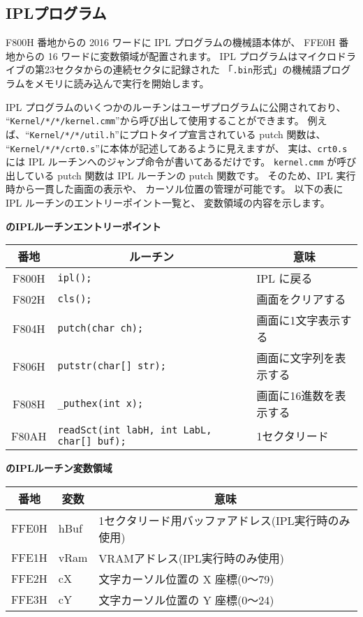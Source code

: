 \subsection{IPLプログラム}
\label{app:ipl}

F800H 番地からの 2016 ワードに IPL プログラムの機械語本体が、
FFE0H 番地からの 16 ワードに変数領域が配置されます。
IPL プログラムはマイクロドライブの第23セクタからの連続セクタに記録された
「\verb/.bin/形式」の機械語プログラムをメモリに読み込んで実行を開始します。

IPL プログラムのいくつかのルーチンはユーザプログラムに公開されており、
``{\tt Kernel/*/*/kernel.cmm}''から呼び出して使用することができます。
例えば、``{\tt Kernel/*/*/util.h}''にプロトタイプ宣言されている putch 関数は、
``{\tt Kernel/*/*/crt0.s}''に本体が記述してあるように見えますが、
実は、{\tt crt0.s }には IPL ルーチンへのジャンプ命令が書いてあるだけです。
{\tt kernel.cmm} が呼び出している putch 関数は IPL ルーチンの putch 関数です。
そのため、IPL 実行時から一貫した画面の表示や、
カーソル位置の管理が可能です。
以下の表に IPL ルーチンのエントリーポイント一覧と、
変数領域の内容を示します。

\begin{center}
{\bf \tac のIPLルーチンエントリーポイント} \\
\begin{tabular}{|c|l|l|}
\hline
番地  & \multicolumn{1}{|c|}{ルーチン} & \multicolumn{1}{|c|}{意味} \\
\hline
F800H & \verb/ipl();/                  & IPL に戻る                 \\
F802H & \verb/cls();/                  & 画面をクリアする           \\
F804H & \verb/putch(char ch);/         & 画面に1文字表示する        \\
F806H & \verb/putstr(char[] str);/     & 画面に文字列を表示する     \\
F808H & \verb/_puthex(int x);/         & 画面に16進数を表示する     \\
F80AH & \verb/readSct(int labH, int LabL, char[] buf);/ & 1セクタリード \\
\hline
\end{tabular}
\end{center}

\begin{center}
{\bf \tac のIPLルーチン変数領域} \\
\begin{tabular}{|c|l|l|}
\hline
番地  & \multicolumn{1}{|c|}{変数} & \multicolumn{1}{|c|}{意味} \\
\hline
FFE0H & hBuf & 1セクタリード用バッファアドレス(IPL実行時のみ使用) \\
FFE1H & vRam & VRAMアドレス(IPL実行時のみ使用)                    \\
FFE2H & cX   & 文字カーソル位置の X 座標(0〜79)                   \\
FFE3H & cY   & 文字カーソル位置の Y 座標(0〜24)                   \\
\hline
\end{tabular}
\end{center}

